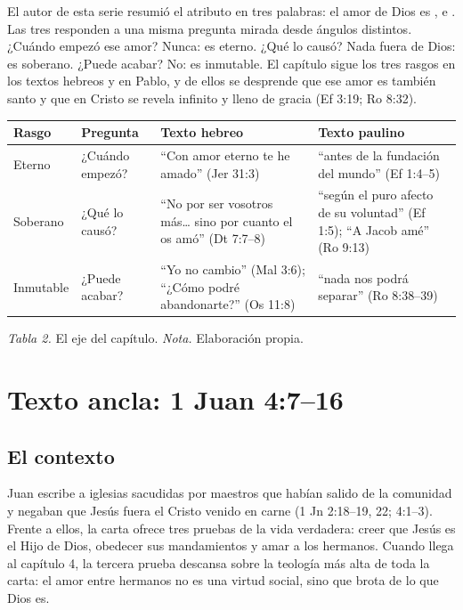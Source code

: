 
El autor de esta serie resumió el atributo en tres palabras: el amor de Dios es ,  e . Las tres responden a una misma pregunta mirada desde ángulos distintos. ¿Cuándo empezó ese amor? Nunca: es eterno. ¿Qué lo causó? Nada fuera de Dios: es soberano. ¿Puede acabar? No: es inmutable. El capítulo sigue los tres rasgos en los textos hebreos y en Pablo, y de ellos se desprende que ese amor es también santo y que en Cristo se revela infinito y lleno de gracia (Ef 3:19; Ro 8:32).

\begin{center}\small\renewcommand{\arraystretch}{1.2}
\begin{tabular}{@{}L{2.4cm}L{4.6cm}L{4.0cm}L{3.8cm}@{}}
\toprule
\textbf{Rasgo} & \textbf{Pregunta} & \textbf{Texto hebreo} & \textbf{Texto paulino} \\ \midrule
Eterno & ¿Cuándo empezó? & ``Con amor eterno te he amado'' (Jer 31:3) & ``antes de la fundación del mundo'' (Ef 1:4--5) \\
Soberano & ¿Qué lo causó? & ``No por ser vosotros más\ldots{} sino por cuanto el \SENOR{} os amó'' (Dt 7:7--8) & ``según el puro afecto de su voluntad'' (Ef 1:5); ``A Jacob amé'' (Ro 9:13) \\
Inmutable & ¿Puede acabar? & ``Yo \SENOR{} no cambio'' (Mal 3:6); ``¿Cómo podré abandonarte?'' (Os 11:8) & ``nada nos podrá separar'' (Ro 8:38--39) \\
\bottomrule
\end{tabular}\par
{\footnotesize\color{gris}\textit{Tabla 2.} El eje del capítulo. \textit{Nota.} Elaboración propia.}
\end{center}

\section{Texto ancla: 1 Juan 4:7--16}

\subsection{El contexto}
Juan escribe a iglesias sacudidas por maestros que habían salido de la comunidad y negaban que Jesús fuera el Cristo venido en carne (1 Jn 2:18--19, 22; 4:1--3). Frente a ellos, la carta ofrece tres pruebas de la vida verdadera: creer que Jesús es el Hijo de Dios, obedecer sus mandamientos y amar a los hermanos. Cuando llega al capítulo 4, la tercera prueba descansa sobre la teología más alta de toda la carta: el amor entre hermanos no es una virtud social, sino que brota de lo que Dios es.

